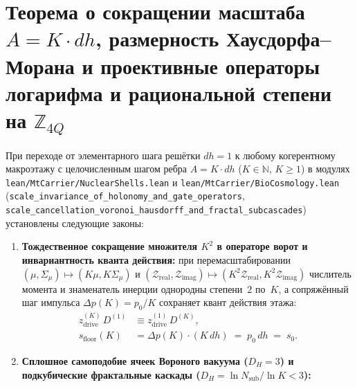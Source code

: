 \section{Теорема о сокращении масштаба \texorpdfstring{$A = K\cdot dh$}{A = K dh}, размерность Хаусдорфа--Морана и проективные операторы логарифма и рациональной степени на \texorpdfstring{$\mathbb{Z}_{4Q}$}{Z4Q}}

\begin{theorem}[Сокращение масштаба $A = K\cdot dh$, размерность Хаусдорфа--Морана $D_H = 3$ ячейки Вороного и проективные операторы логарифма $\log_a(b)$ и рациональной степени $a^{p/q}$ на $\mathbb{Z}_{4Q}$]
\label{thm:mono-scale-hausdorff-log-pow}
При переходе от элементарного шага решётки $dh = 1$ к любому когерентному макроэтажу с целочисленным шагом ребра $A = K\cdot dh$ ($K \in \mathbb{N}$, $K \ge 1$) в модулях \texttt{lean/MtCarrier/NuclearShells.lean} и \texttt{lean/MtCarrier/BioCosmology.lean} (\texttt{scale\_\allowbreak invariance\_\allowbreak of\_\allowbreak holonomy\_\allowbreak and\_\allowbreak gate\_\allowbreak operators}, \texttt{scale\_\allowbreak cancellation\_\allowbreak voronoi\_\allowbreak hausdorff\_\allowbreak and\_\allowbreak fractal\_\allowbreak subcascades}) установлены следующие законы:
\begin{enumerate}[label=\textbf{(\arabic*)},leftmargin=*]
\item \textbf{Тождественное сокращение множителя $K^2$ в операторе ворот и инвариантность кванта действия:}
  при перемасштабировании $(\mu, \Sigma_\mu) \mapsto (K\mu, K\Sigma_\mu)$ и $(\mathcal{Z}_{\mathrm{real}}, \mathcal{Z}_{\mathrm{imag}}) \mapsto (K^2\mathcal{Z}_{\mathrm{real}}, K^2\mathcal{Z}_{\mathrm{imag}})$ числитель момента и знаменатель инерции однородны степени~$2$ по~$K$, а сопряжённый шаг импульса $\Delta p(K) = p_0 / K$ сохраняет квант действия этажа:
  \begin{align}
    z_{\mathrm{drive}}^{(K)}\,D^{(1)} &\equiv z_{\mathrm{drive}}^{(1)}\,D^{(K)}, \label{eq:mono-scale-gate-cancel} \\
    s_{\mathrm{floor}}(K) &= \Delta p(K)\cdot (K\,dh) \;=\; p_0\,dh \;=\; s_0. \label{eq:mono-scale-action-inv}
  \end{align}
\item \textbf{Сплошное самоподобие ячеек Вороного вакуума ($D_H = 3$) и подкубические фрактальные каскады ($D_H = \ln N_{\mathrm{sub}} / \ln K < 3$):}

\end{enumerate}
\end{theorem}
